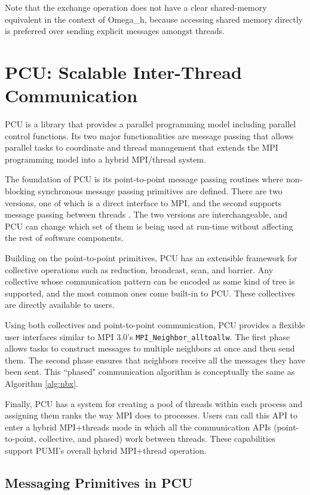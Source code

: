 Note that the exchange operation does not have a clear shared-memory equivalent
in the context of Omega\_h,
because accessing shared memory directly is preferred over sending
explicit messages amongst threads.

\section{PCU: Scalable Inter-Thread Communication}
\label{sec:pcu}

PCU is a library that provides a parallel programming model including
parallel control functions.
Its two major functionalities are message passing that allows parallel tasks to
coordinate and thread management that extends the MPI programming model
into a hybrid MPI/thread system.

The foundation of PCU is its point-to-point message passing routines where
non-blocking synchronous message passing primitives are defined. There are
two versions, one of which is a direct interface to MPI, and the second supports
message passing between threads \cite{ibanez2014hybrid}. The two versions
are interchangeable, and PCU can change which set of them is being used at
run-time without affecting the rest of software components.

Building on the point-to-point primitives, PCU has an extensible framework for
collective operations such as reduction, broadcast, scan, and barrier.
Any collective whose communication pattern can be encoded as some kind of tree
is supported, and the most common ones come built-in to PCU.
These collectives are directly available to users.

Using both collectives and point-to-point communication, PCU provides a flexible
user interfaces similar to MPI 3.0's \texttt{MPI\_Neighbor\_alltoallw}.
The first phase
allows tasks to construct messages to multiple neighbors
at once and then send them.
The second phase ensures that neighbors
receive all the messages they have been sent.
This ``phased" communication algorithm is
conceptually the same as Algorithm \ref{alg:nbx}.

Finally, PCU has a system for creating a pool of threads within each process and
assigning them ranks the way MPI does to processes.
Users can call this API to enter a hybrid MPI+threads mode in which all the
communication APIs (point-to-point, collective, and phased) work between
threads.
These capabilities support PUMI's overall hybrid MPI+thread operation.

\subsection{Messaging Primitives in PCU}
\label{sec:pcu_p2p}

